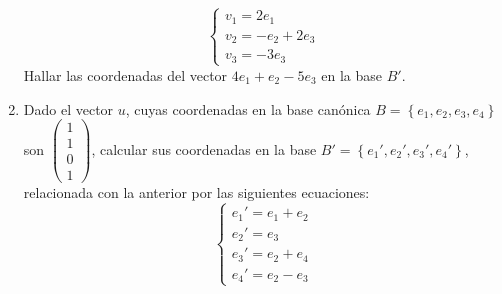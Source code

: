 \documentclass[12pt]{article}
\begin{document}
\begin{enumerate}
  $$
  \begin{cases}
    v_1 = 2e_1\\
    v_2 = -e_2+2e_3\\
    v_3 = -3e_3
  \end{cases}
  $$
  Hallar las coordenadas del vector $4e_1+e_2-5e_3$ en la base $B'$.
  \item Dado el vector $u$, cuyas coordenadas en la base canónica $B=\left\{e_1,e_2,e_3,e_4\right\}$ son $\begin{pmatrix}
    1\\1\\0\\1
  \end{pmatrix}$, calcular sus coordenadas en la base $B'=\left\{e_1',e_2',e_3',e_4'\right\}$, relacionada con la anterior por las siguientes ecuaciones:
  $$
  \begin{cases}
    e_1'=e_1+e_2\\
    e_2'=e_3\\
    e_3'=e_2+e_4\\
    e_4'=e_2-e_3
  \end{cases}
  $$

\end{enumerate}
\end{document}
